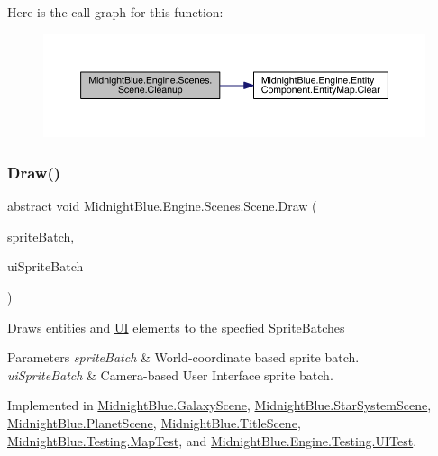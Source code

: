 Here is the call graph for this function\+:
\nopagebreak
\begin{figure}[H]
\begin{center}
\leavevmode
\includegraphics[width=350pt]{class_midnight_blue_1_1_engine_1_1_scenes_1_1_scene_a7200727dfc8a3c8b0d0b9cf54f920c92_cgraph}
\end{center}
\end{figure}
\hypertarget{class_midnight_blue_1_1_engine_1_1_scenes_1_1_scene_a6ec0b4be6c7dc226c9afd308e1fb3fd3}{}\label{class_midnight_blue_1_1_engine_1_1_scenes_1_1_scene_a6ec0b4be6c7dc226c9afd308e1fb3fd3} 
\subsubsection{\texorpdfstring{Draw()}{Draw()}}
{\footnotesize\ttfamily abstract void Midnight\+Blue.\+Engine.\+Scenes.\+Scene.\+Draw (\begin{DoxyParamCaption}\item[{Sprite\+Batch}]{sprite\+Batch,  }\item[{Sprite\+Batch}]{ui\+Sprite\+Batch }\end{DoxyParamCaption})\hspace{0.3cm}{\ttfamily [pure virtual]}}



Draws entities and \hyperlink{namespace_midnight_blue_1_1_engine_1_1_u_i}{UI} elements to the specfied Sprite\+Batches 


\begin{DoxyParams}{Parameters}
{\em sprite\+Batch} & World-\/coordinate based sprite batch.\\
\hline
{\em ui\+Sprite\+Batch} & Camera-\/based User Interface sprite batch.\\
\hline
\end{DoxyParams}


Implemented in \hyperlink{class_midnight_blue_1_1_galaxy_scene_a3646fcf97e067bac267d42aad66e71c4}{Midnight\+Blue.\+Galaxy\+Scene}, \hyperlink{class_midnight_blue_1_1_star_system_scene_ac3d90fb8d914d15b912f5da3cc1aa8a0}{Midnight\+Blue.\+Star\+System\+Scene}, \hyperlink{class_midnight_blue_1_1_planet_scene_af22a201631e5f8c606ec3f7463635977}{Midnight\+Blue.\+Planet\+Scene}, \hyperlink{class_midnight_blue_1_1_title_scene_a03fa806a36226ec5fd0ce09870109c18}{Midnight\+Blue.\+Title\+Scene}, \hyperlink{class_midnight_blue_1_1_testing_1_1_map_test_a03d0a9349662afafaa301a8581fbf01f}{Midnight\+Blue.\+Testing.\+Map\+Test}, and \hyperlink{class_midnight_blue_1_1_engine_1_1_testing_1_1_u_i_test_a8c8604e47a7ac4ef8b8c74e82ff5cb83}{Midnight\+Blue.\+Engine.\+Testing.\+U\+I\+Test}.

